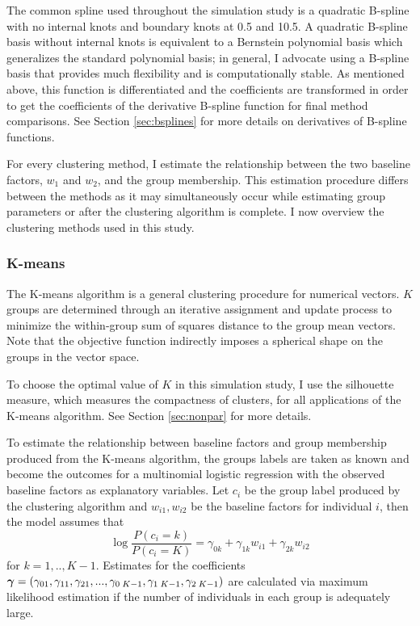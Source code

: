 The common spline used throughout the simulation study is a quadratic B-spline with no internal knots and boundary knots at 0.5 and 10.5. A quadratic B-spline basis without internal knots is equivalent to a Bernstein polynomial basis \cite{lorentz1953} which generalizes the standard polynomial basis; in general, I advocate using a B-spline basis that provides much flexibility and is computationally stable.  As mentioned above, this function is differentiated and the coefficients are transformed in order to get the coefficients of the derivative B-spline function for final method comparisons. See Section \ref{sec:bsplines} for more details on derivatives of B-spline functions.

For every clustering method, I estimate the relationship between the two baseline factors, $w_{1}$ and $w_{2}$, and the group membership. This estimation procedure differs between the methods as it may simultaneously occur while estimating group parameters or after the clustering algorithm is complete. I now overview the clustering methods used in this study.

\subsubsection{K-means}
The K-means algorithm is a general clustering procedure for numerical vectors. $K$ groups are determined through an iterative assignment and update process to minimize the within-group sum of squares distance to the group mean vectors. Note that the objective function indirectly imposes a spherical shape on the groups in the vector space.

To choose the optimal value of $K$ in this simulation study, I use the silhouette measure, which measures the compactness of clusters, for all applications of the K-means algorithm. See Section \ref{sec:nonpar} for more details. 

To estimate the relationship between baseline factors and group membership produced from the K-means algorithm, the groups labels are taken as known and become the outcomes for a multinomial logistic regression with the observed baseline factors as explanatory variables. Let $c_{i}$ be the group label produced by the clustering algorithm and $w_{i1}, w_{i2}$ be the baseline factors for individual $i$, then the model assumes that
$$\log\frac{P(c_{i}=k)}{P(c_{i}=K)} = \gamma_{0k}+\gamma_{1k}w_{i1}+\gamma_{2k}w_{i2}$$
for $k=1,..,K-1$. Estimates for the coefficients $\boldsymbol\gamma = (\gamma_{01},\gamma_{11},\gamma_{21},...,\gamma_{0\;K-1},\gamma_{1\;K-1},\gamma_{2\;K-1})$ are calculated via maximum likelihood estimation if the number of individuals in each group is adequately large.

